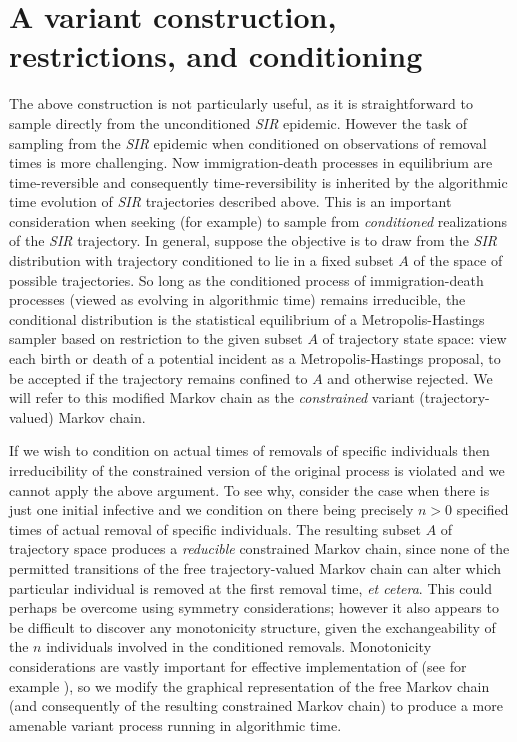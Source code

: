 \documentclass[]{article}
\newcommand{\SIR}{\emph{SIR}\xspace}
\begin{document}
 
\section{A variant construction, restrictions, and conditioning}\label{sec:restrictions}
%
The above construction is not particularly useful, as it is straightforward
to sample directly from the unconditioned \SIR epidemic.
However the task of sampling from
the \SIR epidemic when conditioned on observations
of removal times is more challenging.
Now immigration-death processes in equilibrium are time-reversible
and
consequently
time-reversibility 
is inherited by
the algorithmic time
evolution of \SIR trajectories
described above.
This is an important consideration when seeking (for example)
to sample from \emph{conditioned}
realizations of the \SIR trajectory.
In general, suppose the objective is to draw from the \SIR distribution 
with trajectory conditioned to lie in a fixed subset \(A\)
of the space of possible trajectories.
So long as 
the conditioned process of immigration-death processes
(viewed as evolving in algorithmic time) remains
irreducible,
the conditional distribution
is the statistical equilibrium 
of a Metropolis-Hastings sampler 
based on restriction to the given subset \(A\) of 
trajectory state space: 
view each birth or death of a potential incident as a Metropolis-Hastings proposal, 
to be accepted if the trajectory remains 
confined to \(A\) and otherwise rejected. We
will
refer to this modified Markov chain as the \emph{constrained} variant
(trajectory-valued)
Markov chain.

If we wish to condition on actual times of removals
of specific individuals
then irreducibility 
of the constrained version of the original
process
is violated 
and we cannot apply the above argument.
To see why, consider the case when there is just one initial infective and we condition on there being precisely \(n>0\) specified times of actual
removal of specific individuals.
The resulting subset \(A\) of trajectory space produces a \emph{reducible} constrained Markov chain, since
none of the permitted transitions of
the free trajectory-valued Markov chain can
alter which particular individual is removed at the first removal time, \emph{et cetera}.
This could perhaps be overcome using symmetry considerations;
however it also appears to be difficult to discover any monotonicity structure, given the exchangeability of the \(n\) individuals involved
in the conditioned removals.
Monotonicity considerations are vastly important 
for effective implementation of \CFTP
(see for example \citealp{Kendall-2004c}),
so we modify
the graphical representation of the free Markov chain 
(and consequently of the resulting 
constrained Markov chain)
to produce a more amenable variant process running in algorithmic time.
\end{document}
